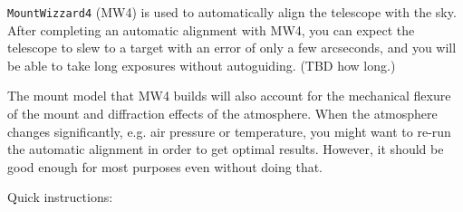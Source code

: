 \documentclass[a4paper, 11pt, fleqn]{memoir}
\begin{document}
\texttt{MountWizzard4} (MW4) is used to automatically align the telescope with the sky.
After completing an automatic alignment with MW4, you can expect the telescope to slew to a target with an error of only a few arcseconds, and you will be able to take long exposures without autoguiding.
(TBD how long.)

The mount model that MW4 builds will also account for the mechanical flexure of the mount and diffraction effects of the atmosphere.
When the atmosphere changes significantly, e.g. air pressure or temperature, you might want to re-run the automatic alignment in order to get optimal results.
However, it should be good enough for most purposes even without doing that.

Quick instructions:
\end{document}
